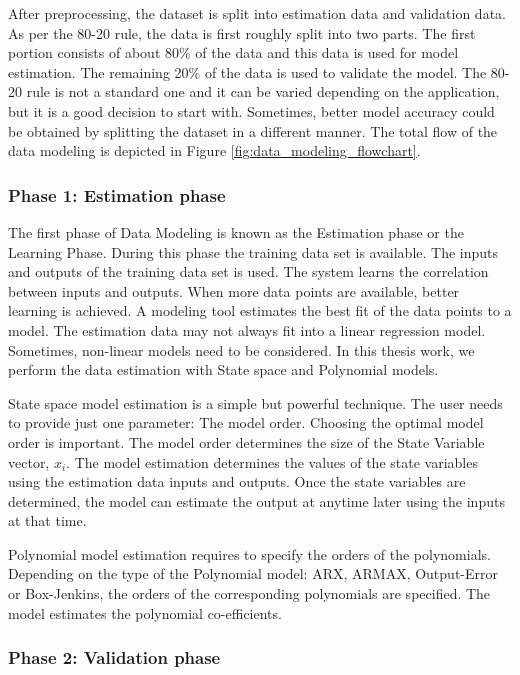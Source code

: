 \documentclass[article,type=msc,colorback,12pt,accentcolor=tud8b,table]{tudthesis}
\begin{document}
 	After preprocessing, the dataset is split into estimation data and validation data. As per the 80-20 rule, the data is first roughly split into two parts. The first portion consists of about 80\% of the data and this data is used for model estimation. The remaining 20\% of the data is used to validate the model. The 80-20 rule is not a standard one and it can be varied depending on the application, but it is a good decision to start with. Sometimes, better model accuracy could be obtained by splitting the dataset in a different manner. The total flow of the data modeling is depicted in Figure \ref{fig:data_modeling_flowchart}.
 	
 	\subsubsection{Phase 1: Estimation phase}
 	
 	The first phase of Data Modeling is known as the Estimation phase or the Learning Phase. During this phase the training data set is available. The inputs and outputs of the training data set is used. The system learns the correlation between inputs and outputs. When more data points are available, better learning is achieved. A modeling tool estimates the best fit of the data points to a model. The estimation data may not always fit into a linear regression model. Sometimes, non-linear models need to be considered. In this thesis work, we perform the data estimation with State space and Polynomial models.
 	
 	State space model estimation is a simple but powerful technique. The user needs to provide just one parameter: The model order. Choosing the optimal model order is important. The model order determines the size of the State Variable vector, $x_i$. The model estimation determines the values of the state variables using the estimation data inputs and outputs. Once the state variables are determined, the model can estimate the output at anytime later using the inputs at that time.

Polynomial model estimation requires to specify the orders of the polynomials. Depending on the type of the Polynomial model: ARX, ARMAX, Output-Error or Box-Jenkins,  the orders of the corresponding polynomials are specified. The model estimates the polynomial co-efficients.


  
\subsubsection{Phase 2: Validation phase}
\end{document}
